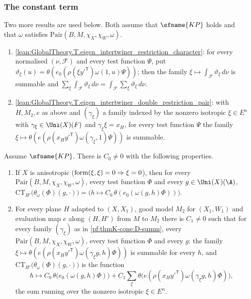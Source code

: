 \subsubsection{The constant term}
Two more results are used below.  Both assume that $\sfname{KP}$ holds and that $\omega$ satisfies
$\mathrm{Pair}(B,M,\chi_X,\chi_W,\omega)$.
\begin{enumerate}[resume*=thmKconeD]
\item\label{pf:thmK-cone:D-swap} \cref{lean:GlobalTheory.T.eigen_intertwiner_restriction_character}: for every
  normalised $(\nu,\mathcal F)$ and every test function $\Psi$, put
  $\vartheta_\xi(u)=\theta(e_0(\rho(\xi y'^{\mathsf T})\omega(1,u)\Psi))$; then the family
  $\xi\mapsto\int_{\mathcal F}\vartheta_\xi\,d\nu$ is summable and
  $\sum_\xi\int_{\mathcal F}\vartheta_\xi\,d\nu=\int_{\mathcal F}\sum_\xi\vartheta_\xi\,d\nu$.
\item\label{pf:thmK-cone:D-summ} \cref{lean:GlobalTheory.T.eigen_intertwiner_double_restriction_pair}: with $H,M_2,e$
  as above and $(\gamma_\xi)$ a family indexed by the nonzero isotropic $\xi\in E^n$ with $\gamma_\xi\in\Uni(X)(F)$ and
  $\gamma_\xi\xi=x_H$, for every test function $\Psi$ the family
  $\xi\mapsto\theta(e(\rho(x_Hy'^{\mathsf T})\omega(\gamma_\xi,1)\Psi))$ is summable.
\end{enumerate}

\begin{lemma}\label{pf:thmK-cone:ctk}
Assume $\sfname{KP}$.  There is $C_0\neq0$ with the following properties.
\begin{enumerate}
\item If $X$ is anisotropic ($\operatorname{form}(\xi,\xi)=0\Rightarrow\xi=0$), then for every
  $\mathrm{Pair}(B,M,\chi_X,\chi_W,\omega)$, every test function $\Phi$ and every $g\in\Uni(X)(\A)$,
  $\mathrm{CT}_{H'}\bigl(\theta_\omega(\Phi)(g,\cdot)\bigr)=\bigl(h\mapsto C_0\,\theta(e_0(\omega(g,h)\Phi))\bigr)$.
\item For every plane $H$ adapted to $(X,X_1)$, good model $M_2$ for $(X_1,W_1)$ and evaluation map $e$ along $(H,H')$
  from $M$ to $M_2$ there is $C_1\neq0$ such that for every family $(\gamma_\xi)$ as in \ref{pf:thmK-cone:D-summ}, every
  $\mathrm{Pair}(B,M,\chi_X,\chi_W,\omega)$, every test function $\Phi$ and every $g$: the family
  $\xi\mapsto\theta(e(\rho(x_Hy'^{\mathsf T})\omega(\gamma_\xi g,h)\Phi))$ is summable for every $h$, and
  $\mathrm{CT}_{H'}\bigl(\theta_\omega(\Phi)(g,\cdot)\bigr)$ is the function
  \begin{equation}\label{pf:thmK-cone:eq-ctk}
    h\longmapsto C_0\,\theta\bigl(e_0(\omega(g,h)\Phi)\bigr)
    +C_1\sum_{\xi}\theta\bigl(e(\rho(x_Hy'^{\mathsf T})\omega(\gamma_\xi g,h)\Phi)\bigr),
  \end{equation}
  the sum running over the nonzero isotropic $\xi\in E^n$.
\end{enumerate}
\end{lemma}

